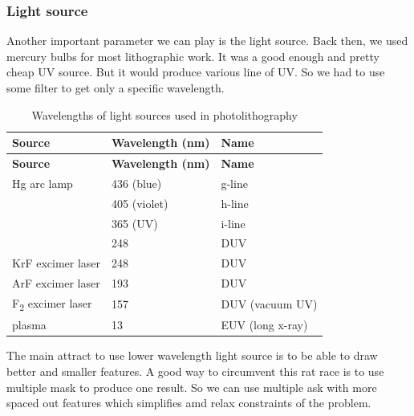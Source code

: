 \documentclass[
]{article}
\begin{document}
\hypertarget{light-source}{%
\subsubsection{Light source}\label{light-source}}

Another important parameter we can play is the light source. Back then,
we used mercury bulbs for most lithographic work. It was a good enough
and pretty cheap UV source. But it would produce various line of UV. So
we had to use some filter to get only a specific wavelength.

\begin{longtable}[]{@{}lll@{}}
\caption{Wavelengths of light sources used in
photolithography}\tabularnewline
\toprule\noalign{}
\textbf{Source} & \textbf{Wavelength (nm)} & \textbf{Name} \\
\midrule\noalign{}
\endfirsthead
\toprule\noalign{}
\textbf{Source} & \textbf{Wavelength (nm)} & \textbf{Name} \\
\midrule\noalign{}
\endhead
\bottomrule\noalign{}
\endlastfoot
Hg arc lamp & 436 (blue) & g-line \\
& 405 (violet) & h-line \\
& 365 (UV) & i-line \\
& 248 & DUV \\
KrF excimer laser & 248 & DUV \\
ArF excimer laser & 193 & DUV \\
F\textsubscript{2} excimer laser & 157 & DUV (vacuum UV) \\
plasma & 13 & EUV (long x-ray) \\
\end{longtable}

The main attract to use lower wavelength light source is to be able to
draw better and smaller features. A good way to circumvent this rat race
is to use multiple mask to produce one result. So we can use multiple
ask with more spaced out features which simplifies amd relax constraints
of the problem.
\end{document}
